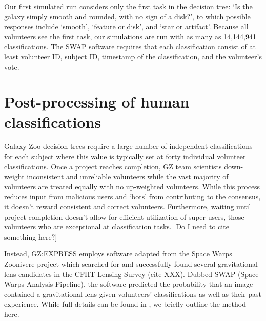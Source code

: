 \documentclass[twocolumn]{aastex6}
\begin{document}


Our first simulated run considers only the first task in the decision tree: 
`Is the galaxy simply smooth and rounded, with no sign of a disk?', to which possible 
responses include `smooth', `feature or disk', and `star or artifact'.  Because all 
volunteers see the first task, our simulations are run with as many as 14,144,941 
classifications.  The SWAP software requires that each classification consist of at least
volunteer ID, subject ID, timestamp of the classification,  and the volunteer's vote.



\section{Post-processing of human classifications}

Galaxy Zoo decision trees require a large 
number of independent classifications for each subject where this value is typically 
set at forty individual volunteer classifications. Once a project reaches completion, 
GZ team scientists down-weight inconsistent and unreliable 
volunteers while the vast majority of volunteers are treated equally with no up-weighted volunteers.
While this process reduces input from malicious users and `bots' from contributing to the consensus, 
it doesn't reward consistent and correct volunteers. Furthermore, waiting until project completion 
doesn't allow for efficient utilization of super-users, those volunteers who are exceptional at 
classification tasks. [Do I need to cite something here?]

Instead, GZ:EXPRESS employs software adapted from the Space Warps Zoonivere project 
\citep{Marshall2016} which searched for and successfully found several gravitational lens 
candidates in the CFHT Lensing Survey (cite XXX).  Dubbed SWAP (Space Warps Analysis Pipeline),  
the software predicted the probability that an image contained a gravitational lens given 
volunteers' classifications as well as their past experience. While full details can be found in 
\cite{Marshall2016}, we briefly outline the method here.  
\end{document}
